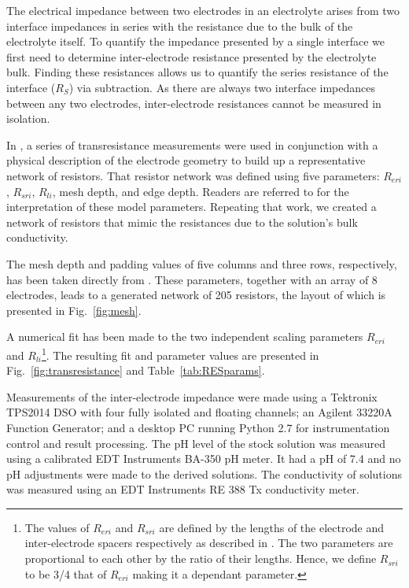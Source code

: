 \documentclass[journal, a4paper]{IEEEtran}
\begin{document}
The electrical impedance between two electrodes in an electrolyte arises from two interface impedances in series with the resistance due to the bulk of the electrolyte itself. To quantify the impedance presented by a single interface we first need to determine inter-electrode resistance presented by the electrolyte bulk. {\color{blue} Finding these resistances allows us to quantify the {\color{blue}series resistance of the interface ($R_{S}$)} via subtraction.} As there are always two interface impedances between any two electrodes, inter-electrode resistances cannot be measured in isolation.

In \cite{ScottSingle2013}, a series of transresistance measurements were used in conjunction with a physical description of the electrode geometry to build up a representative network of resistors. That resistor network was defined using five parameters: $R_{eri}$, $R_{sri}$, $R_{li}$, mesh depth, and edge depth. Readers are referred to \cite{ScottSingle2013} for the interpretation of these model parameters. Repeating that work, we created a network of resistors that mimic the resistances due to the solution's bulk conductivity.

The mesh depth and padding values of five columns and three rows, respectively, has been taken directly from \cite{ScottSingle2013}. {\color{blue} These parameters, together with an array of 8 electrodes, leads to a generated network of 205 resistors, the layout of which is presented in Fig.~\ref{fig:mesh}.}

A numerical fit {\color{blue} has been} made to the two independent scaling parameters $R_{eri}$ and $R_{li}$\footnote{The values of $R_{eri}$ and $R_{sri}$ are defined by the lengths of the electrode and inter-electrode spacers respectively as described in \cite{ScottSingle2013}. The two parameters are proportional to each other by the ratio of their lengths. Hence, we define $R_{sri}$ to be 3/4 that of $R_{eri}$ making it a dependant parameter.}.
The resulting fit and parameter values are presented in Fig.~\ref{fig:transresistance} and Table~\ref{tab:RESparams}.

Measurements of the inter-electrode impedance {\color{blue} were made using} a Tektronix TPS2014 DSO with four fully isolated and floating channels; an Agilent 33220A Function Generator; and a desktop PC {\color{blue} running Python 2.7 for instrumentation control and result processing.} The pH level of the stock solution was measured using a calibrated EDT Instruments BA-350 pH meter. It had a pH of 7.4 and no pH adjustments were made to the derived solutions. {\color{blue} The conductivity of solutions was measured using an EDT Instruments RE 388 Tx conductivity meter.}
\end{document}

